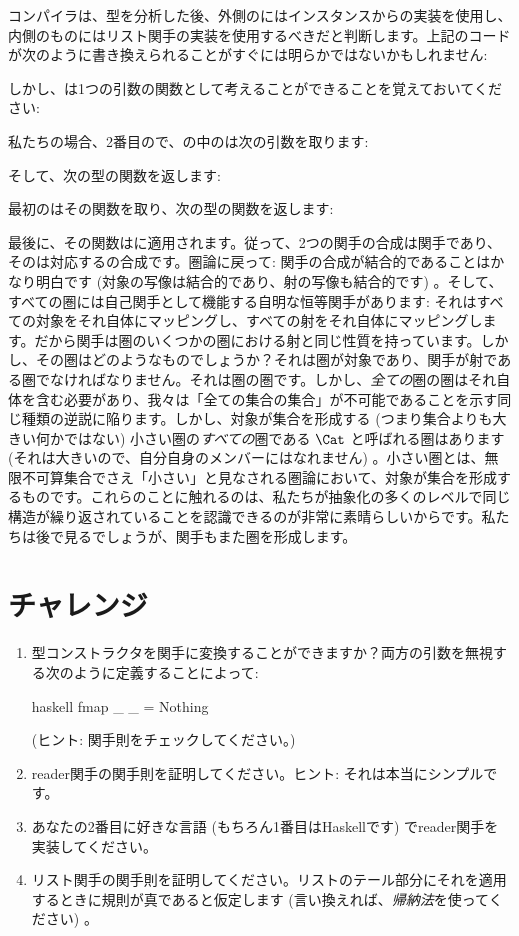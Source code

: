 コンパイラは、型を分析した後、外側のにはインスタンスからの実装を使用し、内側のものにはリスト関手の実装を使用するべきだと判断します。上記のコードが次のように書き換えられることがすぐには明らかではないかもしれません: 

しかし、は1つの引数の関数として考えることができることを覚えておいてください: 

私たちの場合、2番目ので、の中のは次の引数を取ります: 

そして、次の型の関数を返します: 

最初のはその関数を取り、次の型の関数を返します: 

最後に、その関数はに適用されます。従って、2つの関手の合成は関手であり、そのは対応するの合成です。圏論に戻って: 関手の合成が結合的であることはかなり明白です (対象の写像は結合的であり、射の写像も結合的です) 。そして、すべての圏には自己関手として機能する自明な恒等関手があります: それはすべての対象をそれ自体にマッピングし、すべての射をそれ自体にマッピングします。だから関手は圏のいくつかの圏における射と同じ性質を持っています。しかし、その圏はどのようなものでしょうか？それは圏が対象であり、関手が射である圏でなければなりません。それは圏の圏です。しかし、\emph{全ての}圏の圏はそれ自体を含む必要があり、我々は「全ての集合の集合」が不可能であることを示す同じ種類の逆説に陥ります。しかし、対象が集合を形成する (つまり集合よりも大きい何かではない) 小さい圏の\emph{すべての}圏である $\Cat$ と呼ばれる圏はあります (それは大きいので、自分自身のメンバーにはなれません) 。小さい圏とは、無限不可算集合でさえ「小さい」と見なされる圏論において、対象が集合を形成するものです。これらのことに触れるのは、私たちが抽象化の多くのレベルで同じ構造が繰り返されていることを認識できるのが非常に素晴らしいからです。私たちは後で見るでしょうが、関手もまた圏を形成します。

\section{チャレンジ}

\begin{enumerate}
  \tightlist
  \item
         型コンストラクタを関手に変換することができますか？両方の引数を無視する次のように定義することによって: 

        \begin{snip}{haskell}
fmap _ _ = Nothing
\end{snip}

         (ヒント: 関手則をチェックしてください。) 
  \item
        reader関手の関手則を証明してください。ヒント: それは本当にシンプルです。
  \item
        あなたの2番目に好きな言語 (もちろん1番目はHaskellです) でreader関手を実装してください。
  \item
        リスト関手の関手則を証明してください。リストのテール部分にそれを適用するときに規則が真であると仮定します (言い換えれば、\emph{帰納法}を使ってください) 。
\end{enumerate}

